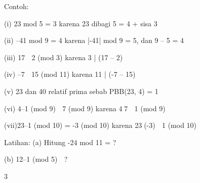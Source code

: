 \documentclass{article}
\begin{document}

Contoh:

(i) 23 mod 5 = 3          karena 23 dibagi 5 = 4 + sisa 3

(ii) –41 mod 9 = 4        karena |-41| mod 9 = 5, dan 9 – 5 = 4

(iii) 17  2 (mod 3)        karena 3 | (17 – 2)   

(iv) –7  15 (mod 11)   karena 11 | (-7 – 15) 

(v) 23 dan 40 relatif prima sebab PBB(23, 4) = 1

(vi) 4–1 (mod 9)  7 (mod 9) karena 47  1 (mod 9)

(vii)23–1 (mod 10) = -3 (mod 10) karena 23(-3)  1 (mod 10)

Latihan: (a) Hitung -24 mod 11 = ?


    (b) 12–1 (mod 5)  ?

3
\end{document}
